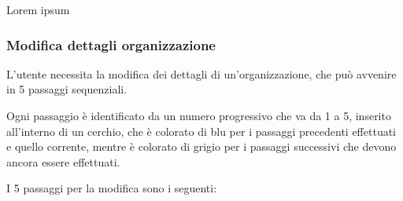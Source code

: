 \documentclass[../manuale-utente.tex]{subfiles}
\begin{document}

Lorem ipsum
\newpage

\subsubsection{Modifica dettagli organizzazione}%
\label{subs:modififica_dettagli_organizzazione}

L'utente necessita la modifica dei dettagli di un'organizzazione, che può avvenire in 5 passaggi sequenziali.

Ogni passaggio è identificato da un numero progressivo che va da 1 a 5, inserito all'interno di un cerchio, che è colorato di blu per i passaggi precedenti effettuati e quello corrente, mentre è colorato di grigio per i passaggi successivi che devono ancora essere effettuati.

I 5 passaggi per la modifica sono i seguenti:
\end{document}
